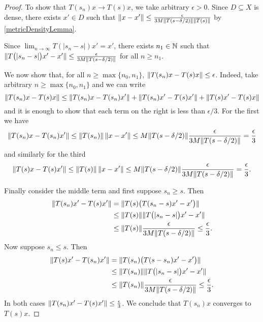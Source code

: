 \begin{proof}
To show that $T(s_n)x \to T(s)x$, we take arbitrary $\epsilon > 0$. Since $D\subseteq X$ is dense, there exists $x' \in D$ such that $\lVert x-x'\rVert \leq \frac{\epsilon}{3M\lVert T(s-\delta/2)\rVert\lVert T(s)\rVert}$ by \ref{metricDensityLemma}.

Since $\lim_{n\to \infty}T(|s_n-s|)x' = x'$, there exists $n_1\in \mathbb{N}$ such that $\lVert T\big(|s_n - s|\big)x' - x'\rVert \leq \frac{\epsilon}{3M\lVert T(s-\delta/2)\rVert}$ for all $n\geq n_1$.

We now show that, for all $n\geq \max\{n_0, n_1\}$, $\lVert T(s_n)x - T(s)x\rVert \leq \epsilon$. Indeed, take arbitrary $n \geq \max\{n_0, n_1\}$ and we can write
\[ \lVert T(s_n)x - T(s)x\rVert \leq \lVert T(s_n)x - T(s_n)x'\rVert + \lVert T(s_n)x' - T(s)x'\rVert + \lVert T(s)x' - T(s)x\rVert \]
and it is enough to show that each term on the right is less than $\epsilon / 3$. For the first we have
\[ \lVert T(s_n)x - T(s_n)x'\rVert \leq \lVert T(s_n)\rVert\,\lVert x-x'\rVert \leq M\lVert T(s-\delta/2)\rVert\frac{\epsilon}{3M\lVert T(s-\delta/2)\rVert} = \frac{\epsilon}{3} \]
and similarly for the third
\[ \lVert T(s)x - T(s)x'\rVert \leq \lVert T(s)\rVert\,\lVert x-x'\rVert \leq M\lVert T(s-\delta/2)\rVert\frac{\epsilon}{3M\lVert T(s-\delta/2)\rVert} = \frac{\epsilon}{3}. \]

Finally consider the middle term and first suppose $s_n \geq s$. Then
\begin{align*}
\lVert T(s_n)x' - T(s)x'\rVert &= \lVert T(s)\big(T(s_n-s)x' - x'\big)\rVert \\
&\leq \lVert T(s)\rVert\lVert T\big(|s_n-s|\big)x' - x'\rVert \\
&\leq \lVert T(s)\rVert\frac{\epsilon}{3M\lVert T(s-\delta/2)\rVert} \leq \frac{\epsilon}{3}.
\end{align*}
Now suppose $s_n \leq s$. Then
\begin{align*}
\lVert T(s)x' - T(s_n)x'\rVert &= \lVert T(s_n)\big(T(s-s_n)x' - x'\big)\rVert \\
&\leq \lVert T(s_n)\rVert\lVert T\big(|s_n-s|\big)x' - x'\rVert \\
&\leq \lVert T(s_n)\rVert\frac{\epsilon}{3M\lVert T(s-\delta/2)\rVert} \leq \frac{\epsilon}{3}.
\end{align*}
In both cases $\lVert T(s_n)x' - T(s)x'\rVert \leq \frac{\epsilon}{3}$.
We conclude that $T(s_n)x$ converges to $T(s)x$.
\end{proof}
